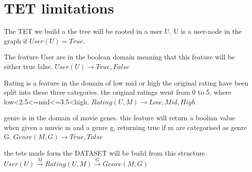 \section{TET limitations}
The TET we build a the tree will be rooted in a user U.
U is a user-node in the graph if $User(U) = True$. 

The feature User are in the boolean domain meaning that this feature will be either true false.
$User(U)\rightarrow {True, False}$

Rating is a feature in the domain of low mid or high the original rating have been split into these three categories.
the original ratings went from 0 to 5, where low<2.5<=mid<=3.5<high.
$Rating(U, M) \rightarrow {Low, Mid, High}$

genre is in the domain of movie genes. this feature will return a boolian value when given a muvie m and a genre g, returning true if m are categorised as genre G.
$Genre(M, G) \rightarrow {True, Talse}$

the tets made form the DATASET will be build from this structure.
$User(U)  \stackrel{M}{\longrightarrow} Rating(U,M) \stackrel{G}{\longrightarrow} Genre(M,G)$
